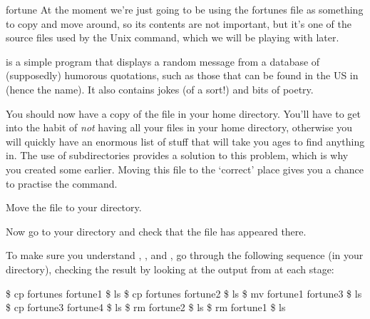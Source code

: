 \begin{linux}{fortune}
  \label{breakbox:fortune}
  At the moment we're just going to be using the fortunes file as something to copy and move around, so its contents are not important, but it's one of the source files used by the Unix  command, which we will be playing with later.

   is a simple program that displays a random message from a database of (supposedly) humorous quotations, such as those that can be found in the US in  (hence the name). It also contains jokes (of a sort!) and bits of poetry.

\end{linux}

You should now have a copy of the file in your home directory.
You'll have to get into the habit of \emph{not} having all your files
in your home directory, otherwise you will quickly have an enormous list
of stuff that will take you ages to find anything in. The use of subdirectories
provides a solution to this problem, which is why you created some
earlier. Moving this file to the `correct' place gives you a chance
to practise the  command.

Move the file  to your  directory.


Now go to your  directory and check that the file
has appeared there.

To make sure you understand , , and
, go through the following sequence (in your
 directory), checking the result by looking at the
output from  at each stage:

\begin{ttoutenv}
\$  cp fortunes fortune1 \return
\$  ls \return
\$  cp fortunes fortune2 \return
\$  ls \return
\$  mv fortune1 fortune3 \return
\$  ls \return
\$  cp fortune3 fortune4 \return
\$  ls \return
\$  rm fortune2 \return
\$  ls \return
\$  rm fortune1 \return
\$  ls \return
\end{ttoutenv}


